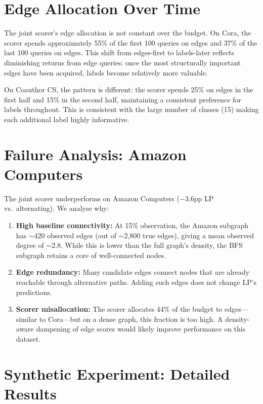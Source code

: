 \documentclass[12pt,a4paper,oneside]{report}
\begin{document}
\section{Edge Allocation Over Time}

The joint scorer's edge allocation is not constant over the budget. On Cora, the scorer spends approximately 55\% of the first 100 queries on edges and 37\% of the last 100 queries on edges. This shift from edges-first to labels-later reflects diminishing returns from edge queries: once the most structurally important edges have been acquired, labels become relatively more valuable.

On Coauthor CS, the pattern is different: the scorer spends 25\% on edges in the first half and 15\% in the second half, maintaining a consistent preference for labels throughout. This is consistent with the large number of classes (15) making each additional label highly informative.

\section{Failure Analysis: Amazon Computers}

The joint scorer underperforms on Amazon Computers ($-3.6$pp LP vs.\ alternating). We analyse why:

\begin{enumerate}[leftmargin=2em]
    \item \textbf{High baseline connectivity:} At 15\% observation, the Amazon subgraph has $\sim$420 observed edges (out of $\sim$2,800 true edges), giving a mean observed degree of $\sim$2.8. While this is lower than the full graph's density, the BFS subgraph retains a core of well-connected nodes.
    \item \textbf{Edge redundancy:} Many candidate edges connect nodes that are already reachable through alternative paths. Adding such edges does not change LP's predictions.
    \item \textbf{Scorer misallocation:} The scorer allocates 44\% of the budget to edges---similar to Cora---but on a dense graph, this fraction is too high. A density-aware dampening of edge scores would likely improve performance on this dataset.
\end{enumerate}

\section{Synthetic Experiment: Detailed Results}
\end{document}
